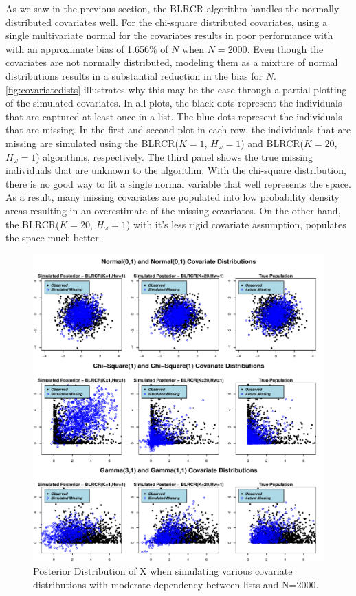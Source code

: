 \documentclass[
  12pt,
]{article}
\begin{document}
As we saw in the previous section, the BLRCR algorithm handles the
normally distributed covariates well. For the chi-square distributed
covariates, using a single multivariate normal for the covariates
results in poor performance with with an approximate bias of 1.656\(\%\)
of \(N\) when \(N=2000\). Even though the covariates are not normally
distributed, modeling them as a mixture of normal distributions results
in a substantial reduction in the bias for \(N\).
\autoref{fig:covariatedists} illustrates why this may be the case
through a partial plotting of the simulated covariates. In all plots,
the black dots represent the individuals that are captured at least once
in a list. The blue dots represent the individuals that are missing. In
the first and second plot in each row, the individuals that are missing
are simulated using the BLRCR(\(K=1\), \(H_\omega=1\)) and
BLRCR(\(K=20\), \(H_\omega=1\)) algorithms, respectively. The third
panel shows the true missing individuals that are unknown to the
algorithm. With the chi-square distribution, there is no good way to fit
a single normal variable that well represents the space. As a result,
many missing covariates are populated into low probability density areas
resulting in an overestimate of the missing covariates. On the other
hand, the BLRCR(\(K=20\), \(H_\omega=1\)) with it's less rigid covariate
assumption, populates the space much better.

\begin{figure}[H]

{\centering \includegraphics{dissertationmain_files/figure-latex/posteriornormalplots-1} 

}

\caption{\label{fig:covariatedists}Posterior Distribution of X when simulating various covariate distributions with moderate dependency between lists and N=2000.}\label{fig:posteriornormalplots}
\end{figure}
\end{document}

